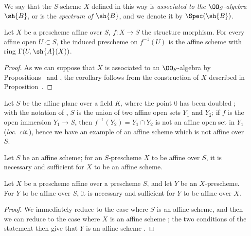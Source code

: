 We say that the $S$-scheme $X$ defined in this way is \emph{associated to the $\OO_S$-algebra $\sh{B}$}, or is the \emph{spectrum of $\sh{B}$}, and we denote it by $\Spec(\sh{B})$.

\begin{cor}[1.3.2]
\label{2.1.3.2}
Let $X$ be a prescheme affine over $S$, $f:X\to S$ the structure morphism.
For every affine open $U\subset S$, the induced prescheme on $f^{-1}(U)$ is the affine scheme with ring $\Gamma(U,\sh{A}(X))$.
\end{cor}

\begin{proof}
\label{proof-2.1.3.2}
As we can suppose that $X$ is associated to an $\OO_S$-algebra by Propositions~ and , the corollary follows from the construction of $X$ described in Proposition~.
\end{proof}

\begin{exm}[1.3.3]
\label{2.1.3.3}
Let $S$ be the affine plane over a field $K$, where the point $0$ has been doubled ; with the notation of , $S$ is the union of two affine open sets $Y_1$ and $Y_2$; if $f$ is the open immersion $Y_1\to S$, then $f^{-1}(Y_2)=Y_1\cap Y_2$ is not an affine open set in $Y_1$ (\emph{loc. cit.}), hence we have an example of an affine scheme which is not affine over $S$.
\end{exm}

\begin{cor}[1.3.4]
\label{2.1.3.4}
Let $S$ be an affine scheme; for an $S$-prescheme $X$ to be affine over $S$, it is necessary and sufficient for $X$ to be an affine scheme.
\end{cor}

\begin{cor}[1.3.5]
\label{2.1.3.5}
Let $X$ be a prescheme affine over a prescheme $S$, and let $Y$ be an $X$-prescheme.
For $Y$ to be affine over $S$, it is necessary and sufficient for $Y$ to be affine over $X$.
\end{cor}

\begin{proof}
\label{proof-2.1.3.5}
We immediately reduce to the case where $S$ is an affine scheme, and then we can reduce to the case where $X$ is an affine scheme ; the two conditions of the statement then give that $Y$ is an affine scheme .
\end{proof}

